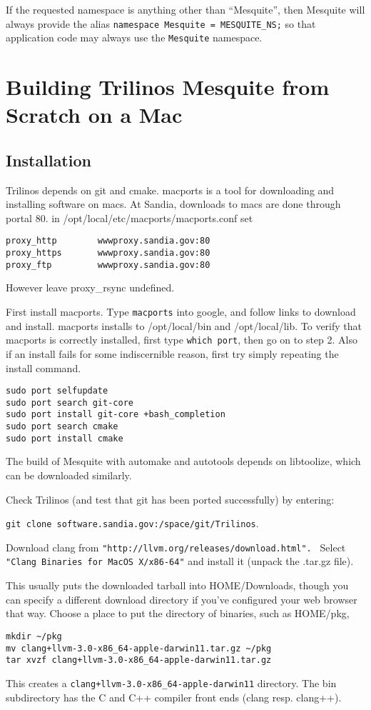 If the requested namespace is anything other than ``Mesquite'', then Mesquite will always provide the alias \texttt{namespace Mesquite = MESQUITE\_NS;} so that application code may always use the \texttt{Mesquite} namespace.

\section{Building Trilinos Mesquite from Scratch on a Mac}
\subsection{Installation}
\label{mac_installation}

Trilinos depends on git and cmake.
macports is a tool for downloading and installing software on macs.
At Sandia, downloads to macs are done through portal 80.
in /opt/local/etc/macports/macports.conf set 
\begin{verbatim}
proxy_http        wwwproxy.sandia.gov:80
proxy_https       wwwproxy.sandia.gov:80
proxy_ftp         wwwproxy.sandia.gov:80
\end{verbatim}
However leave proxy\_rsync undefined.


First install macports.  Type {\tt macports} into google, and follow links to download and install.
macports  installs to /opt/local/bin  and /opt/local/lib.
To verify that macports is correctly installed,  first  type {\tt which port},  then go on to step 2.
Also if an install fails for some indiscernible reason, 
first try simply repeating the install command.

\begin{verbatim}
sudo port selfupdate   
sudo port search git-core
sudo port install git-core +bash_completion
sudo port search cmake
sudo port install cmake   
\end{verbatim}
The build of Mesquite with automake and autotools depends on  libtoolize, which can be downloaded similarly.

Check Trilinos (and test that git has been ported successfully) by entering:

\begin{center}
 {\tt git clone software.sandia.gov:/space/git/Trilinos}.
\end{center}

Download clang from {\tt "http://llvm.org/releases/download.html". } Select {\tt "Clang Binaries for MacOS X/x86-64"} and install it (unpack the .tar.gz file).

This usually puts the downloaded tarball into HOME/Downloads, though you can specify a different download directory if you've configured your web browser that way.  Choose a place to put the directory of binaries, such as  HOME/pkg,
\begin{verbatim}
mkdir ~/pkg
mv clang+llvm-3.0-x86_64-apple-darwin11.tar.gz ~/pkg
tar xvzf clang+llvm-3.0-x86_64-apple-darwin11.tar.gz
\end{verbatim}
This creates a {\tt clang+llvm-3.0-x86\_64-apple-darwin11} directory.  
The bin subdirectory has the C and C++ compiler front ends (clang resp. clang++).
